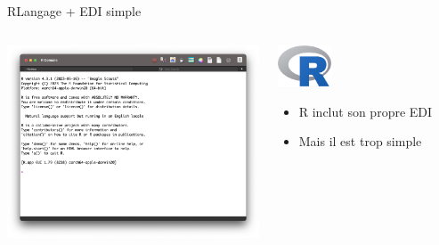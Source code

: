 \documentclass[xcolor=dvipsnames, onlymath, 10pt, aspectratio=169, handout]{beamer}
\begin{document}

\begin{frame}{R}{Langage + EDI simple}

	\begin{columns}[c]
		\begin{column}{0.7\textwidth}
			\begin{center}
				\includegraphics[width = .9\textwidth]{r-editor.png}
			\end{center}
		\end{column}
		\begin{column}{0.3\textwidth}
			\includegraphics[width = 0.3\textwidth]{r.png}
			\begin{itemize}
				\item R inclut son propre EDI
				\item Mais il est trop simple
			\end{itemize}
		\end{column}
	\end{columns}


\end{frame}


\end{document}
